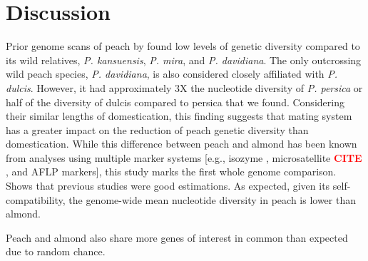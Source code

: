 \documentclass[12pt]{article}
\newcommand{\citex}{\textcolor{red}{\bf CITE }}
\newcommand{\jri}[1]{\textcolor{red}{\emph{#1}}}
\begin{document}
\section*{Discussion}
Prior genome scans of peach by \cite{verde2013high} found low levels of genetic diversity compared to its wild relatives, \emph{P. kansuensis}, \emph{P. mira}, and \emph{P. davidiana}. 
%
%
The only outcrossing wild peach species, \emph{P. davidiana}, is also considered closely affiliated %
with \emph{P. dulcis}. However, it had approximately 3X the nucleotide diversity of \emph{P. persica} \citep{verde2013high} or half of the diversity of dulcis compared to persica that we found. 
Considering their similar lengths of domestication, this finding suggests that mating system has a greater impact on the reduction of peach genetic diversity than domestication.
%
While this difference between peach and almond has been known from analyses using multiple marker systems [e.g., isozyme \citep{mowrey1990isozyme}, microsatellite \citex, and AFLP \citep{aradhya2004molecular} markers], this study marks the first whole genome comparison.
%
Shows that previous studies were good estimations. 
As expected, given its self-compatibility, the genome-wide mean nucleotide diversity in peach is lower than almond. 

Peach and almond also share more genes of interest in common than expected due to random chance.\\
\end{document}
